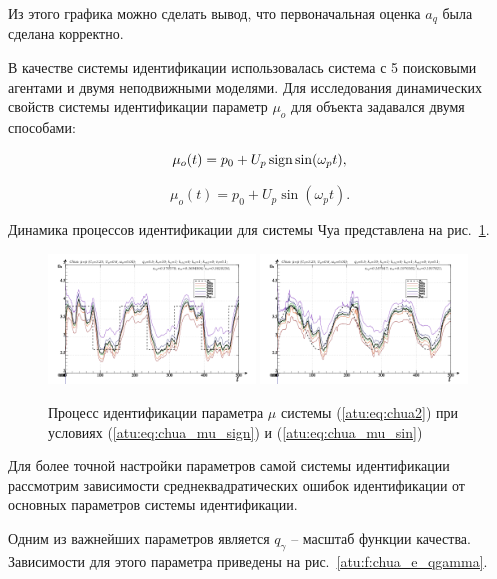Из этого графика можно сделать вывод, что первоначальная оценка $a_q$
была сделана корректно.

В качестве системы идентификации использовалась система с 5 поисковыми агентами и
двумя неподвижными моделями. Для исследования динамических свойств системы идентификации
параметр $\mu_o$ для объекта задавался двумя способами:

\begin{equation}
 \mu_o(t) = p_0 + U_p \operatorname*{sign} \sin( \omega_p t ),
  \label{atu:eq:chua_mu_sign}
\end{equation}

\begin{equation}
 \mu_o(t) = p_0 + U_p \sin( \omega_p t ).
  \label{atu:eq:chua_mu_sin}
\end{equation}

Динамика процессов идентификации для системы Чуа представлена на рис.~\ref{atu:f:chua_id}.


\begin{figure}[htb!]
\centerline{
  \includegraphics[width=0.49\textwidth]{p/cha/chua/chua_m5p-pl_n_sign.png}
  \includegraphics[width=0.49\textwidth]{p/cha/chua/chua_m5p-pl_n_sin.png}
}
\caption{Процесс идентификации параметра $\mu$ системы (\ref{atu:eq:chua2})
  при условиях (\ref{atu:eq:chua_mu_sign}) и (\ref{atu:eq:chua_mu_sin})
}
\label{atu:f:chua_id}
\end{figure}

Для более точной настройки параметров самой системы идентификации
рассмотрим зависимости среднеквадратических ошибок идентификации
от основных параметров системы идентификации.

Одним из важнейших параметров является $q_\gamma$ -- масштаб функции качества.
Зависимости для этого параметра приведены на рис.~\ref{atu:f:chua_e_qgamma}.

